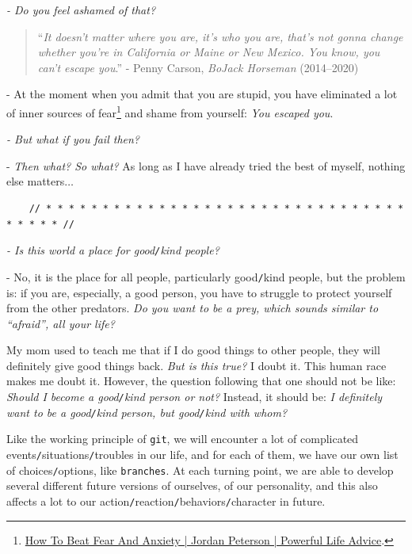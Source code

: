 \documentclass[12pt]{article}
\numberwithin{equation}{section}
\begin{document}
\textit{- Do you feel ashamed of that?}

\begin{quotation}
    ``\textit{It doesn't matter where you are, it's who you are, that's not gonna change whether you're in California or Maine or New Mexico. You know, you can't escape you}.'' - Penny Carson, \textit{BoJack Horseman} (2014--2020)
\end{quotation}

- At the moment when you admit that you are stupid, you have eliminated a lot of inner sources of fear\footnote{\href{https://www.youtube.com/watch?v=bb9g9mtDHZo}{How To Beat Fear And Anxiety | Jordan Peterson | Powerful Life Advice}.} and shame from yourself: \textit{You escaped you}.

\textit{- But what if you fail then?}

- \textit{Then what? So what?} As long as I have already tried the best of myself, nothing else matters$\ldots$

\begin{verbatim}
    // * * * * * * * * * * * * * * * * * * * * * * * * * * * * * * * * * * * * * //
\end{verbatim}

\noindent
{} \textit{- Is this world a place for good\texttt{/}kind people?}
    
- No, it is the place for all people, particularly good\texttt{/}kind people, but the problem is: if you are, especially, a good person, you have to struggle to protect yourself from the other predators. \textit{Do you want to be a prey, which sounds similar to ``afraid'', all your life?} 

My mom used to teach me that if I do good things to other people, they will definitely give good things back. \textit{But is this true?} I doubt it. This human race makes me doubt it. However, the question following that one should not be like: \textit{Should I become a good\texttt{/}kind person or not?} Instead, it should be: \textit{I definitely want to be a good\texttt{/}kind person, but good\texttt{/}kind with whom?}

Like the working principle of \texttt{git}, we will encounter a lot of complicated events\texttt{/}situations\texttt{/}troubles in our life, and for each of them, we have our own list of choices\texttt{/}options, like \texttt{branches}. At each turning point, we are able to develop several different future versions of ourselves, of our personality, and this also affects a lot to our action\texttt{/}reaction\texttt{/}behaviors\texttt{/}character in future.
\end{document}
